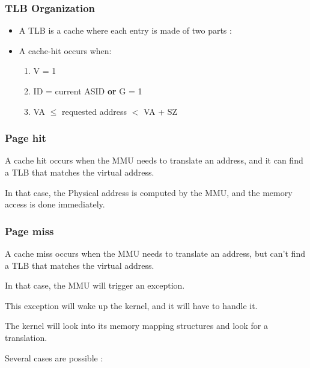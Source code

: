 \begin{frame}
  \frametitle{TLB Organization}

    \begin{itemize}
      \item A TLB is a cache where each entry is made of two parts :

      \begin{center}
      \end{center}

      \item A cache-hit occurs when:
      \begin{enumerate}
      \item
        V = 1
      \item
        ID = current ASID \textbf{or} G = 1
      \item
        VA $\leq$ requested address $<$ VA + SZ
      \end{enumerate}
    \end{itemize}
\end{frame}



\begin{frame}
  \frametitle{Page hit}

  A cache hit occurs when the MMU needs to translate an address, and it can find a TLB that matches the virtual address.

  \-

  In that case, the Physical address is computed by the MMU, and the memory access is done immediately.

\end{frame}

\begin{frame}
  \frametitle{Page miss}

  A cache miss occurs when the MMU needs to translate an address, but can't find a TLB that matches the virtual address.

  \-

  In that case, the MMU will trigger an exception.

  \-

  This exception will wake up the kernel, and it will have to handle it.

  \-

  The kernel will look into its memory mapping structures and look for a translation.

  \-

  Several cases are possible :

\end{frame}


